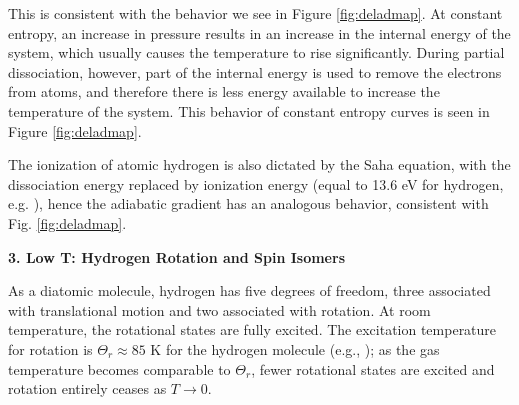 \documentclass[apj]{emulateapj}
\newcommand{\delad}{\nabla_{\rm ad}}
\newcommand{\App}[1]{Appendix~\ref{#1}}
\begin{document}
This is consistent with the behavior we see in Figure \ref{fig:deladmap}. At constant entropy, an increase in pressure results in an increase in the internal energy of the system, which usually causes the temperature to rise significantly. During partial dissociation, however, part of the internal energy is used to remove the electrons from atoms, and therefore there is less energy available to increase the temperature of the system. This behavior of constant entropy curves is seen in Figure \ref{fig:deladmap}. 

The ionization of atomic hydrogen is also dictated by the Saha equation, with the dissociation energy replaced by ionization energy (equal to 13.6 eV for hydrogen, e.g. \citealt{mandl89}), hence the adiabatic gradient has an analogous behavior, consistent with Fig. \ref{fig:deladmap}.





\vspace{0.2in}

\textbf{3. Low T: Hydrogen Rotation and Spin Isomers}

As a diatomic molecule, hydrogen has five degrees of freedom, three associated with translational motion and two associated with rotation. At room temperature, the rotational states are fully excited. The excitation temperature for rotation is $\Theta_r \approx 85$ K for the hydrogen molecule (e.g., \citealt{kittel}); as the gas temperature becomes comparable to $\Theta_r$, fewer rotational states are excited and rotation entirely ceases as $T \rightarrow 0$. %
\end{document}
